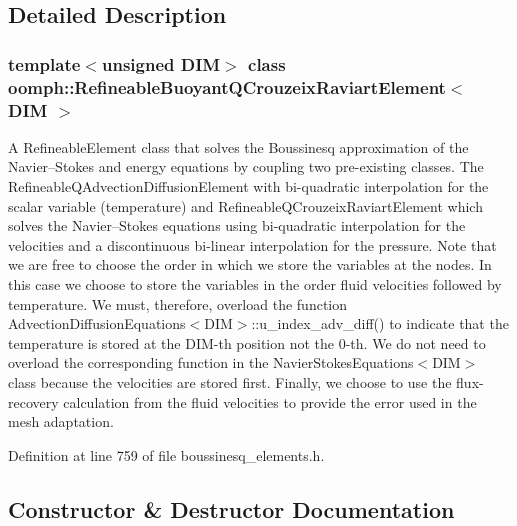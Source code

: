 \subsection{Detailed Description}
\subsubsection*{template$<$unsigned D\+IM$>$\newline
class oomph\+::\+Refineable\+Buoyant\+Q\+Crouzeix\+Raviart\+Element$<$ D\+I\+M $>$}

A Refineable\+Element class that solves the Boussinesq approximation of the Navier--Stokes and energy equations by coupling two pre-\/existing classes. The Refineable\+Q\+Advection\+Diffusion\+Element with bi-\/quadratic interpolation for the scalar variable (temperature) and Refineable\+Q\+Crouzeix\+Raviart\+Element which solves the Navier--Stokes equations using bi-\/quadratic interpolation for the velocities and a discontinuous bi-\/linear interpolation for the pressure. Note that we are free to choose the order in which we store the variables at the nodes. In this case we choose to store the variables in the order fluid velocities followed by temperature. We must, therefore, overload the function Advection\+Diffusion\+Equations$<$\+D\+I\+M$>$\+::u\+\_\+index\+\_\+adv\+\_\+diff() to indicate that the temperature is stored at the D\+I\+M-\/th position not the 0-\/th. We do not need to overload the corresponding function in the Navier\+Stokes\+Equations$<$\+D\+I\+M$>$ class because the velocities are stored first. Finally, we choose to use the flux-\/recovery calculation from the fluid velocities to provide the error used in the mesh adaptation. 

Definition at line 759 of file boussinesq\+\_\+elements.\+h.



\subsection{Constructor \& Destructor Documentation}
\mbox{\label{classoomph_1_1RefineableBuoyantQCrouzeixRaviartElement_a180c3373158434bc08fc69cc0f4392f9}} 
